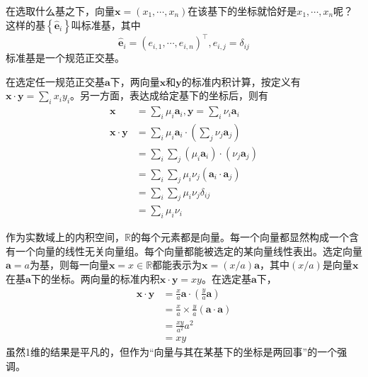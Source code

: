 \documentclass[main.tex]{subfiles}
\begin{document}
\begin{example}
在选取什么基之下，向量$\mathbf{x}=\left(x_1,\cdots,x_n\right)$在该基下的坐标就恰好是$x_1,\cdots,x_n$呢？这样的基$\left\{\mathbf{\hat{e}}_i\right\}$叫标准基，其中
\[\mathbf{\hat{e}}_i=\left(e_{i,1},\cdots,e_{i,n}\right)^\intercal,e_{i,j}=\delta_{ij}\]
标准基是一个规范正交基。

在选定任一规范正交基$\mathbf{a}$下，两向量$\mathbf{x}$和$\mathbf{y}$的标准内积计算，按定义有$\mathbf{x}\cdot\mathbf{y}=\sum_ix_iy_i$。另一方面，表达成给定基下的坐标后，则有
\begin{align*}
\mathbf{x}&=\sum_i\mu_i\mathbf{a}_i,\mathbf{y}=\sum_i\nu_i\mathbf{a}_i\\
\mathbf{x}\cdot\mathbf{y}&=\sum_i\mu_i\mathbf{a}_i\cdot\left(\sum_j\nu_j\mathbf{a}_j\right)\\
&=\sum_i\sum_j\left(\mu_i\mathbf{a}_i\right)\cdot\left(\nu_j\mathbf{a}_j\right)\\
&=\sum_i\sum_j\mu_i\nu_j\left(\mathbf{a}_i\cdot\mathbf{a}_j\right)\\
&=\sum_i\sum_j\mu_i\nu_j\delta_{ij}\\
&=\sum_i\mu_i\nu_i
\end{align*}
\end{example}

\begin{example}\label{exp:II.3.5}
作为实数域上的内积空间，$\mathbb{R}$的每个元素都是向量。每一个向量都显然构成一个含有一个向量的线性无关向量组。每个向量都能被选定的某向量线性表出。选定向量$\mathbf{a}=a$为基，则每一向量$\mathbf{x}=x\in\mathbb{R}$都能表示为$\mathbf{x}=\left(x/a\right)\mathbf{a}$，其中$\left(x/a\right)$是向量$\mathbf{x}$在基$\mathbf{a}$下的坐标。两向量的标准内积$\mathbf{x}\cdot\mathbf{y}=xy$。在选定基$\mathbf{a}$下，
\begin{align*}
    \mathbf{x}\cdot\mathbf{y}&=\frac{x}{a}\mathbf{a}\cdot\left(\frac{y}{a}\mathbf{a}\right)\\
    &=\frac{x}{a}\times\frac{y}{a}\left(\mathbf{a}\cdot\mathbf{a}\right)\\
    &=\frac{xy}{a^2}a^2\\
    &=xy
\end{align*}
虽然1维的结果是平凡的，但作为“向量与其在某基下的坐标是两回事”的一个强调。
\end{example}
\end{document}
